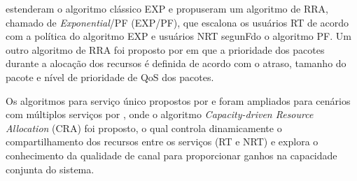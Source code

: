 estenderam o algoritmo clássico \ac{EXP} e propuseram um algoritmo de RRA, chamado de \textit{Exponential}/PF (EXP/PF), que escalona os usuários RT de acordo com a política do algoritmo \ac{EXP} e usuários NRT segunFdo o algoritmo \ac{PF}. Um outro algoritmo de RRA foi proposto por  em que a prioridade dos pacotes durante a alocação dos recursos é definida de acordo com o atraso, tamanho do pacote e nível de prioridade de QoS dos pacotes. 

Os algoritmos para serviço único propostos por  e  foram ampliados para cenários com múltiplos serviços por , onde o algoritmo \textit{Capacity-driven Resource Allocation} (CRA) foi proposto, o qual controla dinamicamente o compartilhamento dos recursos entre os serviços (RT e NRT) e explora o conhecimento da qualidade de canal para proporcionar ganhos na capacidade conjunta do sistema.